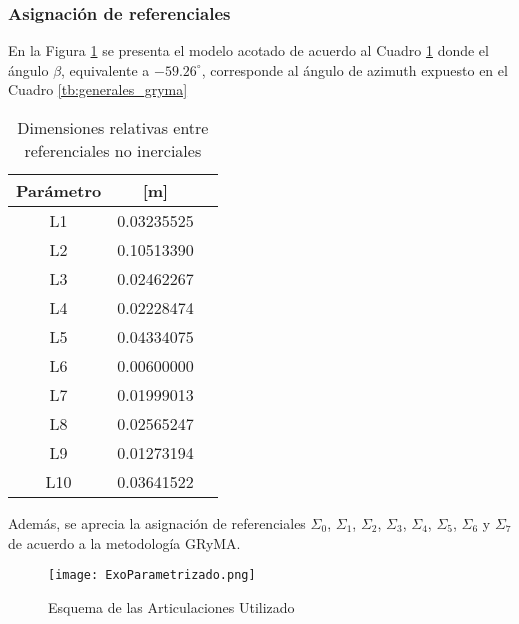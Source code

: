     \subsubsection{Asignación de referenciales}
    \noindent En la Figura \ref{fig:ExoPara} se presenta el modelo acotado de acuerdo al Cuadro
    \ref{tb:dimensiones_referenciales} donde el ángulo $\beta$, equivalente a  $-59.26^\circ $, 
    corresponde al ángulo de azimuth expuesto en el Cuadro \ref{tb:generales_gryma}
    
    \begin{table}[!ht]
        \centering
        \caption{Dimensiones relativas entre referenciales no inerciales}
        \label{tb:dimensiones_referenciales}
        \begin{center}
            \begin{tabular}{ccc}
                Parámetro & [m] \\
                \hline \hline 
                L1 & 0.03235525  \\ 
                L2 & 0.10513390  \\
                L3 & 0.02462267  \\
                L4 & 0.02228474  \\
                L5 & 0.04334075  \\
                L6 & 0.00600000  \\
                L7 & 0.01999013  \\
                L8 & 0.02565247  \\
                L9 & 0.01273194  \\
                L10 & 0.03641522 \\
            \end{tabular}
        \end{center}
    \end{table}

    Además, se aprecia la asignación de referenciales $\Sigma_0$, $\Sigma_1$, $\Sigma_2$,
    $\Sigma_3$, $\Sigma_4$, $\Sigma_5$, $\Sigma_6$ y $\Sigma_7$ de acuerdo a la metodología GRyMA. 
    
    \begin{figure}[H]
        \centering
        \label{fig:referencialesGRyMA}
        \texttt{[image: ExoParametrizado.png]}
        \caption{Esquema de las Articulaciones Utilizado}
        \label{fig:ExoPara}
    \end{figure}